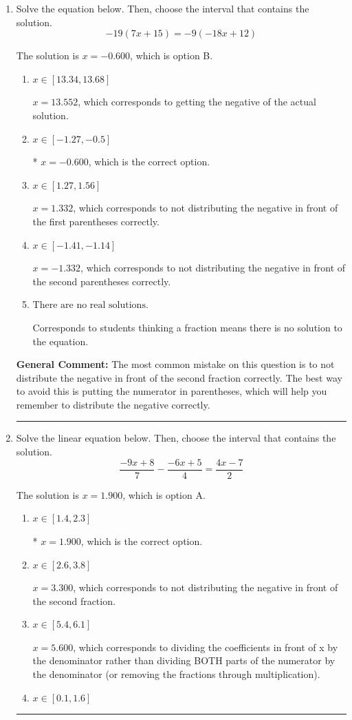 \documentclass{extbook}[14pt]
\newcommand{\litem}[1]{\item #1

\rule{\textwidth}{0.4pt}}
\begin{document}
\begin{enumerate}\litem{
Solve the equation below. Then, choose the interval that contains the solution.
\[ -19(7x + 15) = -9(-18x + 12) \]

The solution is \( x = -0.600 \), which is option B.\begin{enumerate}[label=\Alph*.]
\item \( x \in [13.34, 13.68] \)

$x = 13.552$, which corresponds to getting the negative of the actual solution.
\item \( x \in [-1.27, -0.5] \)

* $x = -0.600$, which is the correct option.
\item \( x \in [1.27, 1.56] \)

$x = 1.332$, which corresponds to not distributing the negative in front of the first parentheses correctly.
\item \( x \in [-1.41, -1.14] \)

$x = -1.332$, which corresponds to not distributing the negative in front of the second parentheses correctly.
\item \( \text{There are no real solutions.} \)

Corresponds to students thinking a fraction means there is no solution to the equation.
\end{enumerate}

\textbf{General Comment:} The most common mistake on this question is to not distribute the negative in front of the second fraction correctly. The best way to avoid this is putting the numerator in parentheses, which will help you remember to distribute the negative correctly.
}
\litem{
Solve the linear equation below. Then, choose the interval that contains the solution.
\[ \frac{-9x + 8}{7} - \frac{-6x + 5}{4} = \frac{4x -7}{2} \]

The solution is \( x = 1.900 \), which is option A.\begin{enumerate}[label=\Alph*.]
\item \( x \in [1.4, 2.3] \)

* $x = 1.900$, which is the correct option.
\item \( x \in [2.6, 3.8] \)

 $x = 3.300$, which corresponds to not distributing the negative in front of the second fraction.
\item \( x \in [5.4, 6.1] \)

 $x = 5.600$, which corresponds to dividing the coefficients in front of x by the denominator rather than dividing BOTH parts of the numerator by the denominator (or removing the fractions through multiplication).
\item \( x \in [0.1, 1.6] \)


\end{enumerate}}
\end{enumerate}
\end{document}
